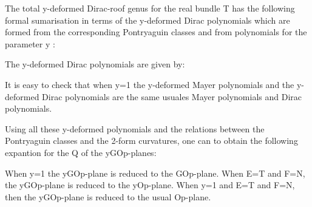 \documentclass[a4paper,a4paper]{article}
\begin{document}
The total  y-deformed Dirac-roof genus for the real  bundle T has the following formal sumarisation in terms of the y-deformed  Dirac polynomials which are formed from the corresponding Pontryaguin classes and from polynomials for the parameter y :
\begin{center}
{  \coordHE{} }
\end{center}
The y-deformed Dirac polynomials are given by:
\begin{center}
{  \coordHE{} }
\end{center}
\begin{center}
{  \coordHE{} }
\end{center}
\begin{center}
{  \coordHE{} }
\end{center}
It is easy to check that when y=1 the y-deformed Mayer polynomials and the y-deformed Dirac polynomials are the same usuales Mayer polynomials  and Dirac polynomials.

 
Using all these y-deformed polynomials and the relations between the Pontryaguin classes and the 2-form curvatures, one can to obtain the following expantion for the Q of the yGOp-planes:
\begin{center}
{  \coordHE{}}
 

\end{center}
When y=1 the yGOp-plane is reduced to the GOp-plane. When E=T and F=N, the yGOp-plane is reduced to the yOp-plane. When y=1 and E=T and F=N, then the yGOp-plane is reduced to the usual Op-plane.  
\end{document}
